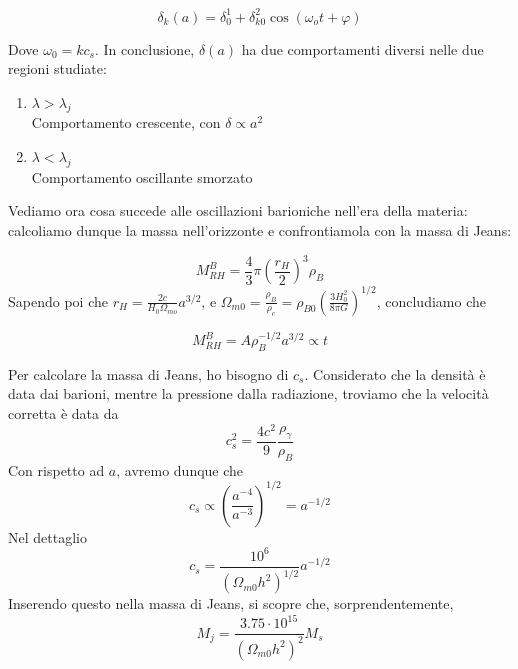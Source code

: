 \documentclass{report}
\begin{document}
\begin{equation}
    \delta_k(a) = \delta_0^1 + \delta_{k0}^2 \cos{(\omega_ot + \varphi)} 
\end{equation}

Dove $\omega_0 = kc_s$. In conclusione, $\delta(a)$ ha due comportamenti diversi nelle due regioni studiate: 
\begin{enumerate}
    \item $\lambda > \lambda_j$ \\
    Comportamento crescente, con $\delta \propto a^2$
    \item $\lambda < \lambda_j$ \\
    Comportamento oscillante smorzato
\end{enumerate}

Vediamo ora cosa succede alle oscillazioni barioniche nell'era della materia: calcoliamo dunque la massa nell'orizzonte e confrontiamola con la massa di Jeans: 

\begin{equation}
    M_{RH}^B = \frac{4}{3}\pi \left(\frac{r_H}{2} \right)^3 \rho_B
\end{equation}
Sapendo poi che $r_H = \frac{2c}{H_0\Omega_{mo}}a^{3/2}$, e $\Omega_{m0}= \frac{\rho_B}{\rho_c} = \rho_{B0}\left(\frac{3H_0^2}{8\pi G}\right)^{1/2}$, concludiamo che 

\begin{equation}
    M_{RH}^B = A\rho_B^{-1/2}a^{3/2} \propto t
\end{equation}

Per calcolare la massa di Jeans, ho bisogno di $c_s$. Considerato che la densità è data dai barioni, mentre la pressione dalla radiazione, troviamo che la velocità corretta è data da 
\begin{equation}
    c_s^2 = \frac{4c^2}{9}\frac{\rho_\gamma}{\rho_B}
\end{equation}
Con rispetto ad $a$, avremo dunque che 
\begin{equation}
    c_s \propto \left(\frac{a^{-4}}{a^{-3}} \right)^{1/2} = a^{-1/2}
\end{equation}
Nel dettaglio
\begin{equation}
    c_s = \frac{10^6}{(\Omega_{m0}h^2)^{1/2}}a^{-1/2}
\end{equation}
Inserendo questo nella massa di Jeans, si scopre che, sorprendentemente, 
\begin{equation}
    M_j = \frac{3.75 \cdot 10^{15}}{(\Omega_{m0}h^2)^2}M_s
\end{equation}
\end{document}
